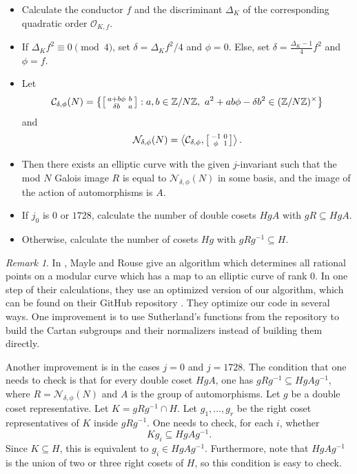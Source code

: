 \documentclass[10pt,leqno]{amsart}
\newcommand\sm[1]{\begin{bsmallmatrix}#1\end{bsmallmatrix}}
\newcommand{\Z}{\mathbb{Z}}
\theoremstyle{definition}
\theoremstyle{remark}
\newtheorem{remark}[theorem]{Remark}
\numberwithin{theorem}{section}
\begin{document}
\begin{itemize}
    \item Calculate the conductor $f$ and the discriminant $\Delta_K$ of the corresponding quadratic order $\mathcal O_{K,f}.$ 
    \item If $\Delta_Kf^2\equiv 0 \pmod 4$, set $\delta=\Delta_Kf^2/4$ and $\phi=0$. Else, set $\delta=\frac{\Delta_K-1}{4}f^2$ and $\phi=f$.
    \item Let $$\mathcal C_{\delta, \phi}(N)=\left\{ \sm{a+b\phi & b \\ \delta b & a} : a,b \in \Z/N\Z, \ a^2+ab\phi-\delta b^2 \in (\Z/N\Z)^\times \right\}$$ and $$\mathcal N_{\delta, \phi}(N)=\left\langle \mathcal C_{\delta, \phi}, \sm{-1 & 0 \\ \phi & 1}\right\rangle.$$ 
    \item Then there exists an elliptic curve with the given $j$-invariant such that the mod $N$ Galois image $R$ is equal to $\mathcal N_{\delta, \phi}(N)$ in some basis, and the image of the action of automorphisms is $A$.
    \item If $j_0$ is $0$ or $1728$, calculate the number of double cosets $HgA$ with $gR \subseteq HgA$. 
    \item Otherwise, calculate the number of cosets $Hg$ with $gRg^{-1} \subseteq H$.
\end{itemize}


\begin{remark}
    In \cite{rousemayle}, Mayle and Rouse give an algorithm which determines all rational points on a modular curve which has a map to an elliptic curve of rank $0$. In one step of their calculations, they use an optimized version of our algorithm, which can be found on their GitHub repository \cite{rousegithub}. They optimize our code in several ways. One improvement is to use Sutherland's functions from the repository \cite{Sutherland2025Magma} to build the Cartan subgroups and their normalizers instead of building them directly.

    Another improvement is in the cases $j=0$ and $j=1728$. The condition that one needs to check is that for every double coset $HgA$, one has $gRg^{-1}\subseteq HgAg^{-1}$, where $R=\mathcal N_{\delta, \phi}(N)$ and $A$ is the group of automorphisms. Let $g$ be a double coset representative. Let $K=gRg^{-1}\cap H$. Let $g_1, \ldots, g_r$ be the right coset representatives of $K$ inside $gRg^{-1}$. One needs to check, for each $i$, whether $$Kg_i \subseteq HgAg^{-1}.$$
    Since $K \subseteq H$, this is equivalent to $g_i\in HgAg^{-1}$. Furthermore, note that $HgAg^{-1}$ is the union of two or three right cosets of $H$, so this condition is easy to check.
\end{remark}
\end{document}
